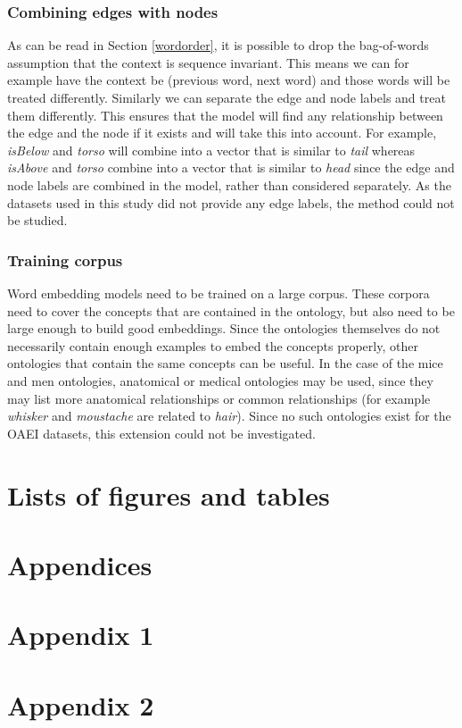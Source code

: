 \documentclass{article}
\begin{document}
  \subsubsection{Combining edges with nodes}
  As can be read in Section \ref{wordorder}, it is possible to drop the bag-of-words assumption that the context is sequence invariant.
  This means we can for example have the context be (previous word, next word) and those words will be treated differently. Similarly we can separate the edge and node labels and treat them differently. This ensures that the model will find any relationship between the edge and the node if it exists and will take this into account. For example, \emph{isBelow} and \emph{torso} will combine into a vector that is similar to \emph{tail} whereas \emph{isAbove} and \emph{torso} combine into a vector that is similar to \emph{head} since the edge and node labels are combined in the model, rather than considered separately. As the datasets used in this study did not provide any edge labels, the method could not be studied.
 
 \subsubsection{Training corpus}
  Word embedding models need to be trained on a large corpus. These corpora need to cover the concepts that are contained in the ontology, but also need to be large enough to build good embeddings. Since the ontologies themselves do not necessarily contain enough examples to embed the concepts properly, other ontologies that contain the same concepts can be useful. In the case of the mice and men ontologies, anatomical or medical ontologies may be used, since they may list more anatomical relationships or common relationships (for example \emph{whisker} and \emph{moustache} are related to \emph{hair}).
  Since no such ontologies exist for the OAEI datasets, this extension could not be investigated.
  
 \section{Lists of figures and tables}
 
 \newpage
 \listoffigures
 \listoftables
 
 \newpage
 
 {}
 
 
 \newpage
 \section{Appendices}
 \begin{appendices}
  \section*{Appendix 1}
  \section*{Appendix 2}
 \end{appendices}
 
 
\end{document}
